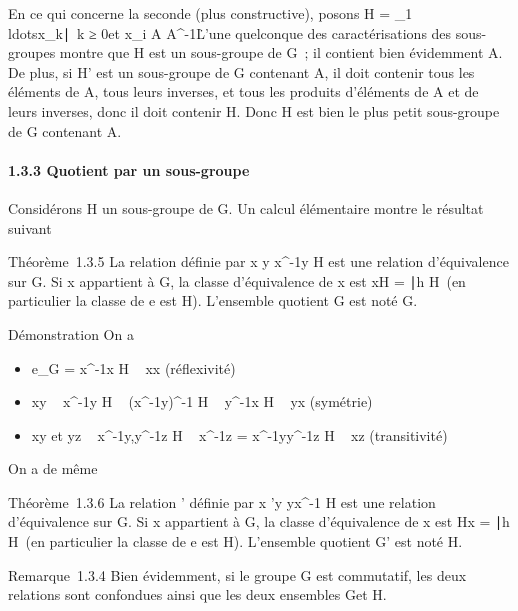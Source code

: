 En ce qui concerne la seconde (plus constructive), posons H =
\x_1\\ldotsx_k\mathrel∣~k
≥ 0\text et x_i \in A \cup
A^-1\. L'une quelconque des caractérisations
des sous-groupes montre que H est un sous-groupe de G~; il contient bien
évidemment A. De plus, si H' est un sous-groupe de G contenant A, il
doit contenir tous les éléments de A, tous leurs inverses, et tous les
produits d'éléments de A et de leurs inverses, donc il doit contenir H.
Donc H est bien le plus petit sous-groupe de G contenant A.

\paragraph{1.3.3 Quotient par un sous-groupe}

Considérons H un sous-groupe de G. Un calcul élémentaire montre le
résultat suivant

Théorème~1.3.5 La relation  définie par x  y
\Leftrightarrow x^-1y \in H est une relation
d'équivalence sur G. Si x appartient à G, la classe d'équivalence de x
est xH = \xh∣h \in
H\ (en particulier la classe de e est H). L'ensemble
quotient G\diagup{} est noté G\diagupH.

Démonstration On a

\begin{itemize}
\itemsep1pt\parskip0pt
\item
  e_G = x^-1x \in H \rigtharrow~ xx (réflexivité)
\item
  xy \rigtharrow~ x^-1y \in H \rigtharrow~ (x^-1y)^-1 \in H \rigtharrow~
  y^-1x \in H \rigtharrow~ yx (symétrie)
\item
  xy et yz \rigtharrow~ x^-1y,y^-1z \in H \rigtharrow~ x^-1z
  = x^-1yy^-1z \in H \rigtharrow~ xz (transitivité)
\end{itemize}

On a de même

Théorème~1.3.6 La relation ' définie par x 'y
\Leftrightarrow yx^-1 \in H est une relation
d'équivalence sur G. Si x appartient à G, la classe d'équivalence de x
est Hx = \hx∣h \in
H\ (en particulier la classe de e est H). L'ensemble
quotient G\diagup{}' est noté H\diagdownG.

Remarque~1.3.4 Bien évidemment, si le groupe G est commutatif, les deux
relations sont confondues ainsi que les deux ensembles G\diagupH et H\diagdownG.

